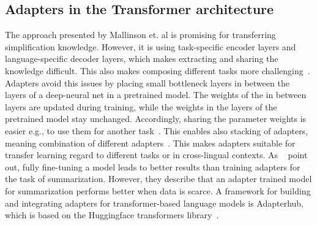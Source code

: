


\subsection{Adapters in the Transformer architecture}
The approach presented by Mallinson et. al is promising for transferring simplification knowledge. However, it is using task-specific
encoder layers and language-specific decoder layers, which makes extracting and sharing the knowledge difficult.
This also makes composing different tasks more challenging~\cite{Pfeiffer2020}.
Adapters avoid this issues by placing small bottleneck layers in between the layers of a deep-neural net in a pretrained model.
The weights of the in between layers are updated during training, while the weights in the layers of the pretrained model stay unchanged.
Accordingly, sharing the parameter weights is easier e.g., to use them for another task~\cite{Houlsby2019}.
This enables also stacking of adapters, meaning combination of different adapters~\cite{PfeifferMAD2020}.
This makes adapters suitable for transfer learning regard to different tasks or in cross-lingual contexts.
As ~\citet{Zhao2022} point out, fully fine-tuning a model leads to better results than training adapters for the task of summarization.
However, they describe that an adapter trained model for summarization performs better when data is scarce.
A framework for building and integrating adapters for transformer-based language models is Adapterhub, which is based on
the Huggingface transformers library~\cite{Pfeiffer2023, Huggingface2023}.

